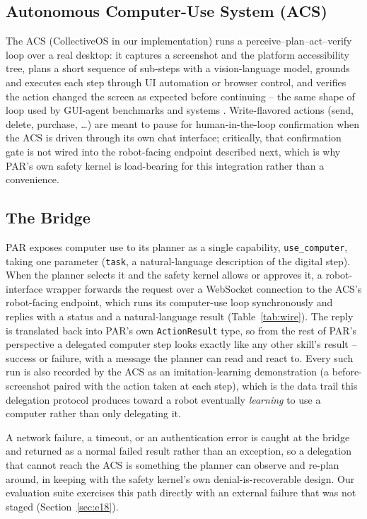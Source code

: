 \documentclass[conference]{IEEEtran}
\begin{document}
\subsection{Autonomous Computer-Use System (ACS)}
\label{sec:acs}
The ACS (CollectiveOS in our implementation) runs a perceive--plan--act--verify loop over a real desktop: it
captures a screenshot and the platform accessibility tree, plans a short sequence of sub-steps with a vision-language model, grounds and executes each step through UI automation or browser control, and verifies
the action changed the screen as expected before continuing -- the same shape of loop used by GUI-agent
benchmarks and systems \cite{zhou2024webarena,deng2023mind2web,hong2024cogagent,anthropic2024computeruse}. Write-flavored actions (send, delete, purchase, \ldots) are meant to pause
for human-in-the-loop confirmation when the ACS is driven through its own chat interface; critically, that
confirmation gate is not wired into the robot-facing endpoint described next, which is why PAR's own safety
kernel is load-bearing for this integration rather than a convenience.

\subsection{The Bridge}
PAR exposes computer use to its planner as a single capability, \texttt{use\_computer}, taking one parameter (\texttt{task},
a natural-language description of the digital step). When the planner selects it and the safety kernel allows
or approves it, a robot-interface wrapper forwards the request over a WebSocket connection to the ACS's
robot-facing endpoint, which runs its computer-use loop synchronously and replies with a status and a
natural-language result (Table~\ref{tab:wire}). The reply is translated back into PAR's own \texttt{ActionResult} type, so from
the rest of PAR's perspective a delegated computer step looks exactly like any other skill's result -- success or
failure, with a message the planner can read and react to. Every such run is also recorded by the ACS as an
imitation-learning demonstration (a before-screenshot paired with the action taken at each step), which is
the data trail this delegation protocol produces toward a robot eventually \emph{learning} to use a computer rather
than only delegating it.

A network failure, a timeout, or an authentication error is caught at the bridge and returned as a normal
failed result rather than an exception, so a delegation that cannot reach the ACS is something the planner
can observe and re-plan around, in keeping with the safety kernel's own denial-is-recoverable design. Our
evaluation suite exercises this path directly with an external failure that was not staged (Section~\ref{sec:e18}).
\end{document}
